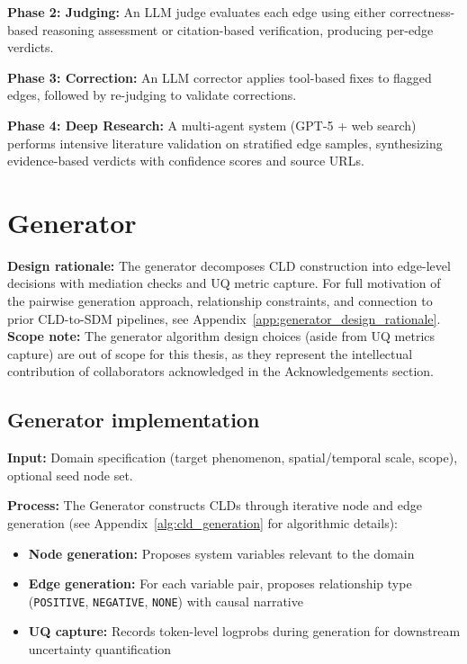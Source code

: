 \textbf{Phase 2: Judging:} An LLM judge evaluates each edge using either correctness-based reasoning assessment or citation-based verification, producing per-edge verdicts.

\textbf{Phase 3: Correction:} An LLM corrector applies tool-based fixes to flagged edges, followed by re-judging to validate corrections.

\textbf{Phase 4: Deep Research:} A multi-agent system (GPT-5 + web search) performs intensive literature validation on stratified edge samples, synthesizing evidence-based verdicts with confidence scores and source URLs.

\section{Generator}
\label{sec:generator}

\textbf{Design rationale:} The generator decomposes CLD construction into edge-level decisions with mediation checks and UQ metric capture. For full motivation of the pairwise generation approach, relationship constraints, and connection to prior CLD-to-SDM pipelines, see Appendix~\ref{app:generator_design_rationale}. \textbf{Scope note:} The generator algorithm design choices (aside from UQ metrics capture) are out of scope for this thesis, as they represent the intellectual contribution of collaborators acknowledged in the Acknowledgements section.

\subsection{Generator implementation}
\textbf{Input:} Domain specification (target phenomenon, spatial/temporal scale, scope), optional seed node set.

\textbf{Process:} The Generator constructs CLDs through iterative node and edge generation (see Appendix~\ref{alg:cld_generation} for algorithmic details):
\begin{itemize}[noitemsep]
    \item \textbf{Node generation:} Proposes system variables relevant to the domain
    \item \textbf{Edge generation:} For each variable pair, proposes relationship type (\texttt{POSITIVE}, \texttt{NEGATIVE}, \texttt{NONE}) with causal narrative
    \item \textbf{UQ capture:} Records token-level logprobs during generation for downstream uncertainty quantification
\end{itemize}

